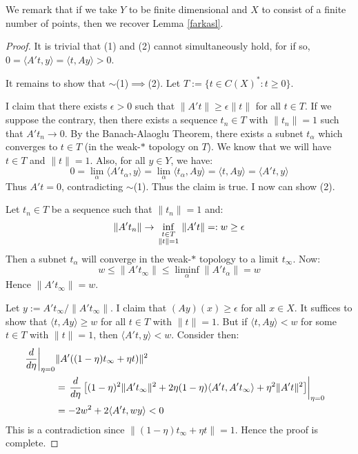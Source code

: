 \documentclass{amsart}
\numberwithin{equation}{section}
\begin{document}
We remark that if we take $Y$ to be finite dimensional and $X$ to consist 
of a finite number of points, then we recover Lemma \ref{farkasl}.

\begin{proof}
It is trivial that (1) and (2) cannot simultaneously hold, 
for if so, $0=\langle A't,y\rangle=\langle t,Ay\rangle>0$.

It remains to show that $\sim$(1)$\implies$(2).  Let 
$T:=\{t\in C(X)^*:t\geq 0\}$.

I claim that there exists $\epsilon>0$ such that 
$\|A't\|\geq\epsilon\|t\|$ for all $t\in T$.  If we 
suppose the contrary, then there exists a sequence $t_n\in T$ with 
$\|t_n\|=1$ such that $A't_n\to 0$.  By the Banach-Alaoglu 
Theorem, there exists a subnet $t_\alpha$ which converges to 
$t\in T$ (in the weak-$*$ topology on $T$).  We know that we will 
have $t\in T$ and $\|t\|=1$.  Also, for all $y\in Y$, we have:
\begin{equation}
0=\lim_\alpha\langle A't_\alpha,y\rangle=
\lim_\alpha\langle t_\alpha,Ay\rangle=\langle t,Ay\rangle=\langle A't,y\rangle
\end{equation}
Thus $A't=0$, contradicting $\sim$(1).  Thus the claim is 
true.  I now can show (2).

Let $t_n\in T$ be a sequence such that $\|t_n\|=1$ and:
\begin{equation}
\|A't_n\|\to\inf_{\begin{smallmatrix}t\in T\cr\|t\|=1\end{smallmatrix}}
\|A't\|=:w\geq\epsilon
\end{equation}
Then a subnet $t_\alpha$ will converge in the weak-$*$ 
topology to a limit $t_{\infty}$.  Now:
\begin{equation}
w\leq\|A't_{\infty}\|\leq\liminf_\alpha\|A't_\alpha\|=w
\end{equation}
Hence $\|A't_{\infty}\|=w$.

Let $y:=A't_{\infty}/\|A't_{\infty}\|$.  I claim that 
$(Ay)(x)\geq\epsilon$ for all $x\in X$.  It suffices to 
show that $\langle t,Ay\rangle\geq w$ for all $t\in T$ 
with $\|t\|=1$.  But if $\langle t,Ay\rangle<w$ for some 
$t\in T$ with $\|t\|=1$, then 
$\langle A't,y\rangle<w$.  Consider then:
\begin{equation}
\begin{split}
\left.\frac d{d\eta}\right|_{\eta=0}
&\|A'((1-\eta)t_{\infty}+\eta t)\|^2\cr
&=\left.\frac d{d\eta}
\left[(1-\eta)^2\|A't_{\infty}\|^2+2\eta(1-\eta)\langle A't,A't_{\infty}\rangle
+\eta^2 \|A't\|^2\right]\right|_{\eta=0}\cr
&=-2w^2+2\langle A't,wy\rangle<0
\end{split}
\end{equation}
This is a contradiction since $\|(1-\eta)t_{\infty}+\eta t\|=1$.  
Hence the proof is complete.
\end{proof}
\end{document}
